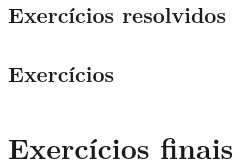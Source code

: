 \subsection*{Exercícios resolvidos}

\emconstrucao

\subsection*{Exercícios}

\emconstrucao


\section{Exercícios finais}

\emconstrucao

% 
